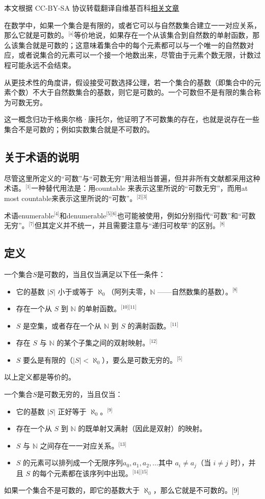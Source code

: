 
本文根据 CC-BY-SA 协议转载翻译自维基百科\href{https://en.wikipedia.org/wiki/Countable_set}{相关文章}

在数学中，如果一个集合是有限的，或者它可以与自然数集合建立一一对应关系，那么它就是可数的。\(^\text{[a]}\)等价地说，如果存在一个从该集合到自然数的单射函数，那么该集合就是可数的；这意味着集合中的每个元素都可以与一个唯一的自然数对应，或者说集合的元素可以一个接一个地数出来，尽管由于元素个数无限，计数过程可能永远不会结束。

从更技术性的角度讲，假设接受可数选择公理，若一个集合的基数（即集合中的元素个数）不大于自然数集合的基数，则它是可数的。一个可数但不是有限的集合称为可数无穷。

这一概念归功于格奥尔格·康托尔，他证明了不可数集的存在，也就是说存在一些集合不是可数的；例如实数集合就是不可数的。
\subsection{关于术语的说明}
尽管这里所定义的“可数”与“可数无穷”用法相当普遍，但并非所有文献都采用这种术语。\(^\text{[1]}\)一种替代用法是：用countable 来表示这里所说的“可数无穷”，而用at most countable来表示这里所说的“可数”。\(^\text{[2][3]}\)

术语enumerable\(^\text{[4]}\)和denumerable\(^\text{[5][6]}\)也可能被使用，例如分别指代“可数”和“可数无穷”。\(^\text{[7]}\)但其定义并不统一，并且需要注意与“递归可枚举”的区别。\(^\text{[8]}\)
\subsection{定义}
一个集合$S$是可数的，当且仅当满足以下任一条件：
\begin{itemize}
\item 它的基数 $|S|$ 小于或等于 $\aleph_{0}$（阿列夫零，$\mathbb{N}$ ——自然数集的基数）。\(^\text{[8]}\)
\item 存在一个从 $S$ 到 $\mathbb{N}$ 的单射函数。\(^\text{[10][11]}\)
\item $S$ 是空集，或者存在一个从 $\mathbb{N}$ 到 $S$ 的满射函数。\(^\text{[11]}\)
\item 存在 $S$ 与 $\mathbb{N}$ 的某个子集之间的双射映射。\(^\text{[12]}\)
\item $S$ 要么是有限的（$|S| < \aleph_{0}$），要么是可数无穷的。\(^\text{[5]}\)
\end{itemize}
以上定义都是等价的。

一个集合$S$是可数无穷的，当且仅当：
\begin{itemize}
\item 它的基数 $|S|$ 正好等于 $\aleph_{0}$。\(^\text{[9]}\)
\item 存在一个从 $S$ 到 $\mathbb{N}$ 的既单射又满射（因此是双射）的映射。
\item $S$ 与 $\mathbb{N}$ 之间存在一一对应关系。\(^\text{[13]}\)
\item $S$ 的元素可以排列成一个无限序列$a_{0}, a_{1}, a_{2}, \ldots$其中 $a_i \neq a_j$（当 $i \neq j$ 时），并且 $S$ 的每个元素都在该序列中出现。\(^\text{[14][15]}\)
\end{itemize}
如果一个集合不是可数的，即它的基数大于 $\aleph_{0}$，那么它就是不可数的。[9]
